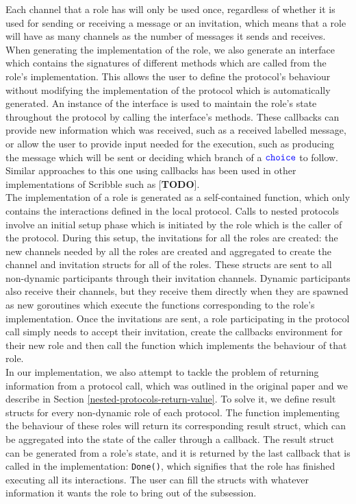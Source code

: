 \documentclass[12pt,twoside]{report}
\begin{document}
Each channel that a role has will only be used once, regardless of whether it is used for sending or receiving a message or an invitation, which means that a role will have as many channels as the number of messages it sends and receives.\\

When generating the implementation of the role, we also generate an interface which contains the signatures of different methods which are called from the role's implementation. This allows the user to define the protocol's behaviour without modifying the implementation of the protocol which is automatically generated. An instance of the interface is used to maintain the role's state throughout the protocol by calling the interface's methods. These callbacks can provide new information which was received, such as a received labelled message, or allow the user to provide input needed for the execution, such as producing the message which will be sent or deciding which branch of a ${\color{blue}\mathtt{choice}}$ to follow. Similar approaches to this one using callbacks has been used in other implementations of Scribble such as [\textbf{TODO}].\\

The implementation of a role is generated as a self-contained function, which only contains the interactions defined in the local protocol. Calls to nested protocols involve an initial setup phase which is initiated by the role which is the caller of the protocol. During this setup, the invitations for all the roles are created: the new channels needed by all the roles are created and aggregated to create the channel and invitation structs for all of the roles. These structs are sent to all non-dynamic participants through their invitation channels. Dynamic participants also receive their channels, but they receive them directly when they are spawned as new goroutines which execute the functions corresponding to the role's implementation. Once the invitations are sent, a role participating in the protocol call simply needs to accept their invitation, create the callbacks environment for their new role and then call the function which implements the behaviour of that role.\\

In our implementation, we also attempt to tackle the problem of returning information from a protocol call, which was outlined in the original paper\cite{nestedprotocols} and we describe in Section \ref{nested-protocols-return-value}. To solve it, we define result structs for every non-dynamic role of each protocol. The function implementing the behaviour of these roles will return its corresponding result struct, which can be aggregated into the state of the caller through a callback. The result struct can be generated from a role's state, and it is returned by the last callback that is called in the implementation: \texttt{Done()}, which signifies that the role has finished executing all its interactions. The user can fill the structs with whatever information it wants the role to bring out of the subsession.\\
\end{document}
